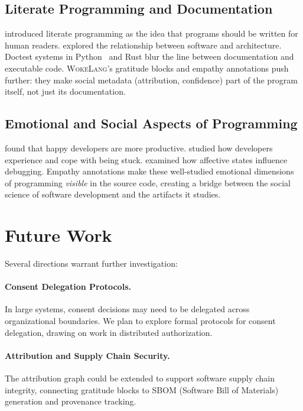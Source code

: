 \documentclass[11pt,a4paper]{article}
\newcommand{\WokeLang}{\textsc{WokeLang}}
\begin{document}
\subsection{Literate Programming and Documentation}

\citet{knuth1984literate} introduced literate programming as the
idea that programs should be written for human readers.
\citet{gabriel1996patterns} explored the relationship between
software and architecture.  Doctest systems in
Python~\citep{doctest2004} and Rust blur the line between
documentation and executable code.  \WokeLang{}'s gratitude blocks
and empathy annotations push further: they make social metadata
(attribution, confidence) part of the program itself, not just its
documentation.

\subsection{Emotional and Social Aspects of Programming}

\citet{graziotin2014happy} found that happy developers are more
productive.  \citet{muller2015stuck} studied how developers experience
and cope with being stuck.  \citet{ford2015paradise} examined how
affective states influence debugging.  Empathy annotations make these
well-studied emotional dimensions of programming \emph{visible} in
the source code, creating a bridge between the social science of
software development and the artifacts it studies.

\section{Future Work}
\label{sec:future}

Several directions warrant further investigation:

\paragraph{Consent Delegation Protocols.}
In large systems, consent decisions may need to be delegated across
organizational boundaries.  We plan to explore formal protocols for
consent delegation, drawing on work in distributed authorization.

\paragraph{Attribution and Supply Chain Security.}
The attribution graph could be extended to support software supply
chain integrity, connecting gratitude blocks to SBOM (Software Bill of
Materials) generation and provenance tracking.
\end{document}

